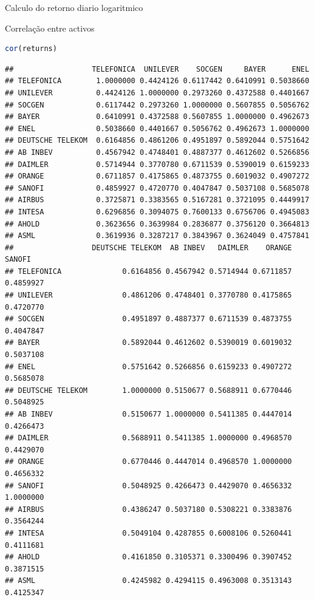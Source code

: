 \documentclass[
  12pt,
  brazil,
  a4paper,
  openany]{book}
\begin{document}
Calculo do retorno diario logaritmico

Correlação entre activos

\begin{lstlisting}[language=R]
cor(returns)
\end{lstlisting}

\begin{lstlisting}
##                  TELEFONICA  UNILEVER    SOCGEN     BAYER      ENEL
## TELEFONICA        1.0000000 0.4424126 0.6117442 0.6410991 0.5038660
## UNILEVER          0.4424126 1.0000000 0.2973260 0.4372588 0.4401667
## SOCGEN            0.6117442 0.2973260 1.0000000 0.5607855 0.5056762
## BAYER             0.6410991 0.4372588 0.5607855 1.0000000 0.4962673
## ENEL              0.5038660 0.4401667 0.5056762 0.4962673 1.0000000
## DEUTSCHE TELEKOM  0.6164856 0.4861206 0.4951897 0.5892044 0.5751642
## AB INBEV          0.4567942 0.4748401 0.4887377 0.4612602 0.5266856
## DAIMLER           0.5714944 0.3770780 0.6711539 0.5390019 0.6159233
## ORANGE            0.6711857 0.4175865 0.4873755 0.6019032 0.4907272
## SANOFI            0.4859927 0.4720770 0.4047847 0.5037108 0.5685078
## AIRBUS            0.3725871 0.3383565 0.5167281 0.3721095 0.4449917
## INTESA            0.6296856 0.3094075 0.7600133 0.6756706 0.4945083
## AHOLD             0.3623656 0.3639984 0.2836877 0.3756120 0.3664813
## ASML              0.3619936 0.3287217 0.3843967 0.3624049 0.4757841
##                  DEUTSCHE TELEKOM  AB INBEV   DAIMLER    ORANGE    SANOFI
## TELEFONICA              0.6164856 0.4567942 0.5714944 0.6711857 0.4859927
## UNILEVER                0.4861206 0.4748401 0.3770780 0.4175865 0.4720770
## SOCGEN                  0.4951897 0.4887377 0.6711539 0.4873755 0.4047847
## BAYER                   0.5892044 0.4612602 0.5390019 0.6019032 0.5037108
## ENEL                    0.5751642 0.5266856 0.6159233 0.4907272 0.5685078
## DEUTSCHE TELEKOM        1.0000000 0.5150677 0.5688911 0.6770446 0.5048925
## AB INBEV                0.5150677 1.0000000 0.5411385 0.4447014 0.4266473
## DAIMLER                 0.5688911 0.5411385 1.0000000 0.4968570 0.4429070
## ORANGE                  0.6770446 0.4447014 0.4968570 1.0000000 0.4656332
## SANOFI                  0.5048925 0.4266473 0.4429070 0.4656332 1.0000000
## AIRBUS                  0.4386247 0.5037180 0.5308221 0.3383876 0.3564244
## INTESA                  0.5049104 0.4287855 0.6008106 0.5260441 0.4111681
## AHOLD                   0.4161850 0.3105371 0.3300496 0.3907452 0.3871515
## ASML                    0.4245982 0.4294115 0.4963008 0.3513143 0.4125347

\end{lstlisting}
\end{document}

